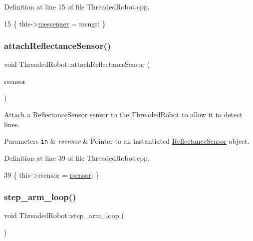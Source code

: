 Definition at line 15 of file Threaded\+Robot.\+cpp.


\begin{DoxyCode}
15 \{ this->\hyperlink{class_threaded_robot_a7ff65f6f18c5d3a9d5823e0a00b46c9f}{messenger} = msngr; \}
\end{DoxyCode}
\mbox{\label{class_threaded_robot_a51cbd0787fa757506942c0f36780983e}} 
\subsubsection{\texorpdfstring{attach\+Reflectance\+Sensor()}{attachReflectanceSensor()}}
{\footnotesize\ttfamily void Threaded\+Robot\+::attach\+Reflectance\+Sensor (\begin{DoxyParamCaption}\item[{\hyperlink{class_reflectance_sensor}{Reflectance\+Sensor} $\ast$}]{rsensor }\end{DoxyParamCaption})}



Attach a \hyperlink{class_reflectance_sensor}{Reflectance\+Sensor} sensor to the \hyperlink{class_threaded_robot}{Threaded\+Robot} to allow it to detect lines. 


\begin{DoxyParams}[1]{Parameters}
\mbox{\tt in}  & {\em rsensor} & Pointer to an instantiated \hyperlink{class_reflectance_sensor}{Reflectance\+Sensor} object. \\
\hline
\end{DoxyParams}


Definition at line 39 of file Threaded\+Robot.\+cpp.


\begin{DoxyCode}
39 \{ this->rsensor = \hyperlink{class_threaded_robot_a6dcf388032425561c387f153ea141c79}{rsensor}; \}
\end{DoxyCode}
\mbox{\label{class_threaded_robot_a2224a8a7536e9ffb7d7a35c57280bddb}} 
\subsubsection{\texorpdfstring{step\+\_\+arm\+\_\+loop()}{step\_arm\_loop()}}
{\footnotesize\ttfamily void Threaded\+Robot\+::step\+\_\+arm\+\_\+loop (\begin{DoxyParamCaption}\item[{void}]{ }\end{DoxyParamCaption})\hspace{0.3cm}{\ttfamily [private]}}



